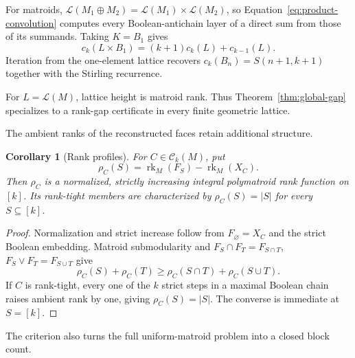 \documentclass[11pt]{article}
\newtheorem{corollary}[theorem]{Corollary}
\theoremstyle{definition}
\theoremstyle{remark}
\newcommand{\rk}{\operatorname{rk}}
\newcommand{\cL}{\mathcal L}
\newcommand{\cC}{\mathcal C}
\begin{document}
For matroids, $\cL(M_1\oplus M_2)=\cL(M_1)\times\cL(M_2)$, so
Equation~\eqref{eq:product-convolution} computes every Boolean-antichain layer
of a direct sum from those of its summands.  Taking $K=B_1$ gives
\[
 c_k(L\times B_1)=(k+1)c_k(L)+c_{k-1}(L).
\]
Iteration from the one-element lattice recovers
$c_k(B_n)=S(n+1,k+1)$ together with the Stirling recurrence.

For $L=\cL(M)$, lattice height is matroid rank.  Thus
Theorem~\ref{thm:global-gap} specializes to a rank-gap certificate in every
finite geometric lattice.

The ambient ranks of the reconstructed faces retain additional structure.

\begin{corollary}[Rank profiles]\label{cor:rank-profile}
For $C\in\cC_k(M)$, put
\[
 \rho_C(S)=\rk_M(F_S)-\rk_M(X_C).
\]
Then $\rho_C$ is a normalized, strictly increasing integral polymatroid rank
function on $[k]$.
Its rank-tight members are characterized by
$\rho_C(S)=|S|$ for every $S\subseteq[k]$.
\end{corollary}

\begin{proof}
Normalization and strict increase follow from $F_\varnothing=X_C$ and the
strict Boolean embedding.  Matroid submodularity and
$F_S\cap F_T=F_{S\cap T}$, $F_S\vee F_T=F_{S\cup T}$ give
\[
 \rho_C(S)+\rho_C(T)\ge
 \rho_C(S\cap T)+\rho_C(S\cup T).
\]
If $C$ is rank-tight, every one of the $k$ strict steps in a maximal Boolean
chain raises ambient rank by one, giving $\rho_C(S)=|S|$.  The converse is
immediate at $S=[k]$.
\end{proof}

The criterion also turns the full uniform-matroid problem into a closed
block count.
\end{document}
